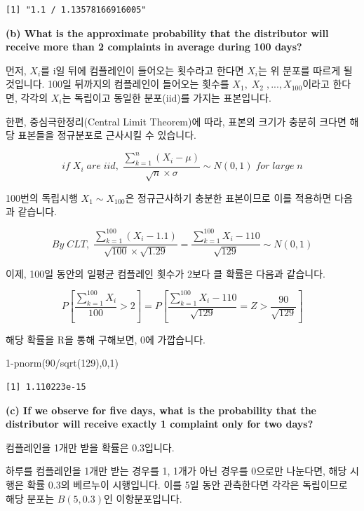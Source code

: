 \documentclass[
  a4paper,
  DIV=11,
  numbers=noendperiod]{scrreprt}
\newenvironment{Shaded}{\begin{snugshade}}{\end{snugshade}}
\newcommand{\DecValTok}[1]{\textcolor[rgb]{0.68,0.00,0.00}{#1}}
\newcommand{\FunctionTok}[1]{\textcolor[rgb]{0.28,0.35,0.67}{#1}}
\newcommand{\NormalTok}[1]{\textcolor[rgb]{0.00,0.23,0.31}{#1}}
\newcommand{\SpecialCharTok}[1]{\textcolor[rgb]{0.37,0.37,0.37}{#1}}
\begin{document}
\begin{verbatim}
[1] "1.1 / 1.13578166916005"
\end{verbatim}

\textbf{(b) What is the approximate probability that the distributor
will receive more than 2 complaints in average during 100 days?}

먼저, \(X_i\)를 i일 뒤에 컴플레인이 들어오는 횟수라고 한다면 \(X_i\)는
위 분포를 따르게 될 것입니다. 100일 뒤까지의 컴플레인이 들어오는 횟수를
\(X_1,\;X_2\;,...,X_{100}\)이라고 한다면, 각각의 \(X_i\)는 독립이고
동일한 분포(iid)를 가지는 표본입니다.

한편, 중심극한정리(Central Limit Theorem)에 따라, 표본의 크기가 충분히
크다면 해당 표본들을 정규분포로 근사시킬 수 있습니다.

\[if\;X_i\;are\;iid,\;\frac{\sum_{k=1}^{n}(X_i-\mu)}{\sqrt{n}\times\sigma}\sim N(0,1)\;for\;large\;n\]

100번의 독립시행 \(X_1\sim X_{100}\)은 정규근사하기 충분한 표본이므로
이를 적용하면 다음과 같습니다.

\[By\;CLT,\;\frac{\sum_{k=1}^{100}(X_i-1.1)}{\sqrt{100}\times\sqrt{1.29}}=\frac{\sum_{k=1}^{100}X_i-110}{\sqrt{129}}\sim N(0,1)\]

이제, 100일 동안의 일평균 컴플레인 횟수가 2보다 클 확률은 다음과
같습니다.

\[P[\frac{\sum_{k=1}^{100}X_i}{100}>2]=P[\frac{\sum_{k=1}^{100}X_i-110}{\sqrt{129}}=Z>\frac{90}{\sqrt{129}}]\]

해당 확률을 R을 통해 구해보면, 0에 가깝습니다.

\begin{Shaded}
\begin{Highlighting}[]
\DecValTok{1}\SpecialCharTok{{-}}\FunctionTok{pnorm}\NormalTok{(}\DecValTok{90}\SpecialCharTok{/}\FunctionTok{sqrt}\NormalTok{(}\DecValTok{129}\NormalTok{),}\DecValTok{0}\NormalTok{,}\DecValTok{1}\NormalTok{)}
\end{Highlighting}
\end{Shaded}

\begin{verbatim}
[1] 1.110223e-15
\end{verbatim}

\textbf{(c) If we observe for five days, what is the probability that
the distributor will receive exactly 1 complaint only for two days?}

컴플레인을 1개만 받을 확률은 0.3입니다.

하루를 컴플레인을 1개만 받는 경우를 1, 1개가 아닌 경우를 0으로만
나눈다면, 해당 시행은 확률 0.3의 베르누이 시행입니다. 이를 5일 동안
관측한다면 각각은 독립이므로 해당 분포는 \(B(5,0.3)\)인 이항분포입니다.
\end{document}
